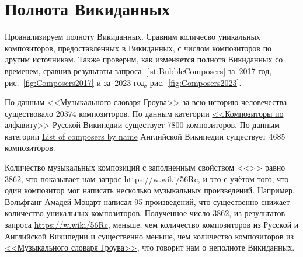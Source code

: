 \section{Полнота Викиданных}

Проанализируем полноту Викиданных. 
Сравним количесво уникальных композиторов, предоставленных в Викиданных, 
с числом композиторов по другим источникам. 
Также проверим, как изменяется полнота Викиданных со временем, 
сравнив результаты запроса~\ref{lst:BubbleComposers} за~2017 год, 
рис.~\ref{fig:Composers2017} и за~2023 год, рис.~\ref{fig:Composers2023}.

По данным 
\href{https://ru.wikipedia.org/?curid=1362802}
     {<<Музыкального словаря Гроува>>} 
за всю историю человечества существовало \num{20374} композиторов. 
По данным категории 
\href{https://ru.wikipedia.org/?curid=155531}
     {<<Композиторы по алфавиту>>} 
Русской Википедии существует \num{7800} композиторов. 
По данным категории 
\href{https://en.wikipedia.org/?curid=6921880}
     {List of composers by name} 
Английской Википедии существует \num{4685} композиторов.


Количество музыкальных композиций с заполненным свойством <<>> равно \num{3862}, что показывает нам запрос \href{https://w.wiki/56Rc}{https://w.wiki/56Rc}, и это с учётом того, что один композитор мог написать несколько музыкальных произведений. Например, \href{https://ru.wikipedia.org/wiki/Моцарт,_Вольфганг_Амадей}{Вольфганг Амадей Моцарт} написал \num{95} произведений, что существенно снижает количество уникальных композиторов. Полученное число \num{3862}, из результатов запроса \href{https://w.wiki/56Rc}{https://w.wiki/56Rc}, меньше, чем количество композиторов из Русской и Английской Википедии и существенно меньше, чем количество композиторов из \href{https://ru.wikipedia.org/wiki/Музыкальный_словарь_Гроува}{<<Музыкального словаря Гроува>>}, что говорит нам о неполноте Викиданных.

